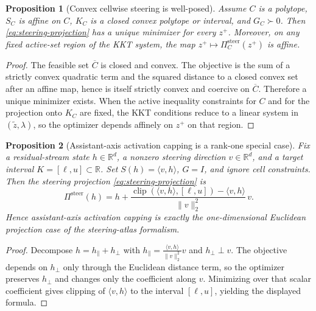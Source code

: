 \documentclass[11pt]{article}
\theoremstyle{definition}
\theoremstyle{plain}
\newtheorem{proposition}{Proposition}[section]
\theoremstyle{remark}
\newcommand{\R}{\mathbb{R}}
\begin{document}
\begin{proposition}[Convex cellwise steering is well-posed]
\label{prop:convex-steering}
Assume $C$ is a polytope, $S_C$ is affine on $C$, $K_C$ is a closed convex polytope or interval, and $G_C\succ 0$.
Then \eqref{eq:steering-projection} has a unique minimizer for every $z^+$.
Moreover, on any fixed active-set region of the KKT system, the map $z^+\mapsto \Pi^{\mathrm{steer}}_C(z^+)$ is affine.
\end{proposition}

\begin{proof}
The feasible set $\overline C$ is closed and convex.
The objective is the sum of a strictly convex quadratic term and the squared distance to a closed convex set after an affine map, hence is itself strictly convex and coercive on $\overline C$.
Therefore a unique minimizer exists.
When the active inequality constraints for $C$ and for the projection onto $K_C$ are fixed, the KKT conditions reduce to a linear system in $(\tilde z,\lambda)$, so the optimizer depends affinely on $z^+$ on that region.
\end{proof}

\begin{proposition}[Assistant-axis activation capping is a rank-one special case]
\label{prop:assistant-axis-special-case}
Fix a residual-stream state $h\in\R^d$, a nonzero steering direction $v\in\R^d$, and a target interval $K=[\ell,u]\subset\R$.
Set $S(h)=\langle v,h\rangle$, $G=I$, and ignore cell constraints.
Then the steering projection \eqref{eq:steering-projection} is
\[
\Pi^{\mathrm{steer}}(h)
=
h
+
\frac{\operatorname{clip}(\langle v,h\rangle,[\ell,u])-\langle v,h\rangle}{\|v\|_2^2}\,v.
\]
Hence assistant-axis activation capping is exactly the one-dimensional Euclidean projection case of the steering-atlas formalism.
\end{proposition}

\begin{proof}
Decompose $h=h_\parallel+h_\perp$ with $h_\parallel=\frac{\langle v,h\rangle}{\|v\|_2^2}v$ and $h_\perp\perp v$.
The objective depends on $h_\perp$ only through the Euclidean distance term, so the optimizer preserves $h_\perp$ and changes only the coefficient along $v$.
Minimizing over that scalar coefficient gives clipping of $\langle v,h\rangle$ to the interval $[\ell,u]$, yielding the displayed formula.
\end{proof}
\end{document}
